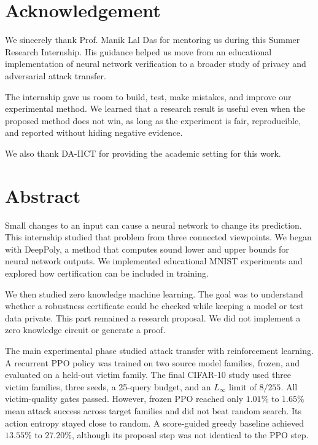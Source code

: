 \documentclass[11pt,a4paper]{report}
\begin{document}
\chapter*{Acknowledgement}

We sincerely thank Prof. Manik Lal Das for mentoring us during this Summer Research Internship. His guidance helped us move from an educational implementation of neural network verification to a broader study of privacy and adversarial attack transfer.

The internship gave us room to build, test, make mistakes, and improve our experimental method. We learned that a research result is useful even when the proposed method does not win, as long as the experiment is fair, reproducible, and reported without hiding negative evidence.

We also thank DA-IICT for providing the academic setting for this work.

\chapter*{Abstract}

Small changes to an input can cause a neural network to change its prediction. This internship studied that problem from three connected viewpoints. We began with DeepPoly, a method that computes sound lower and upper bounds for neural network outputs. We implemented educational MNIST experiments and explored how certification can be included in training.

We then studied zero knowledge machine learning. The goal was to understand whether a robustness certificate could be checked while keeping a model or test data private. This part remained a research proposal. We did not implement a zero knowledge circuit or generate a proof.

The main experimental phase studied attack transfer with reinforcement learning. A recurrent PPO policy was trained on two source model families, frozen, and evaluated on a held-out victim family. The final CIFAR-10 study used three victim families, three seeds, a 25-query budget, and an \(L_\infty\) limit of \(8/255\). All victim-quality gates passed. However, frozen PPO reached only \(1.01\%\) to \(1.65\%\) mean attack success across target families and did not beat random search. Its action entropy stayed close to random. A score-guided greedy baseline achieved \(13.55\%\) to \(27.20\%\), although its proposal step was not identical to the PPO step.
\end{document}
